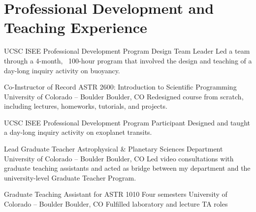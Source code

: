 \section{Professional Development and Teaching Experience}


		{UCSC ISEE Professional Development Program}
		{Design Team Leader}
		{}
		{}
		{Led a team through a 4-month, ~100-hour program that involved the design and teaching of a day-long inquiry activity on buoyancy.}

		{Co-Instructor of Record}
		{ASTR 2600: Introduction to Scientific Programming}
		{University of Colorado -- Boulder}
		{Boulder, CO}
		{Redesigned course from scratch, including lectures, homeworks, tutorials, and projects.}

		{UCSC ISEE Professional Development Program}
		{Participant}
		{}
		{}
		{Designed and taught a day-long inquiry activity on exoplanet transits.}

		{Lead Graduate Teacher}
		{Astrophysical \& Planetary Sciences Department}
		{University of Colorado -- Boulder}
		{Boulder, CO}
		{Led video consultations with graduate teaching assistants and acted as bridge between my department and the university-level Graduate Teacher Program.}

		{Graduate Teaching Assistant for ASTR 1010}
		{Four semesters}
		{University of Colorado -- Boulder}
		{Boulder, CO}
		{Fulfilled laboratory and lecture TA roles}
